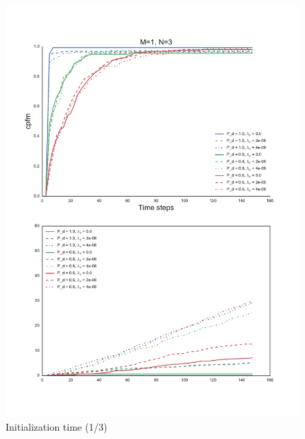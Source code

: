 \begin{figure}
\centering
\includegraphics[height = .9\textheight]{Figures/plots/Scenario1_Init-Time(1-3).pdf}
\caption{Initialization time (1/3)}\label{fig:init_time_1-3}
\end{figure}

